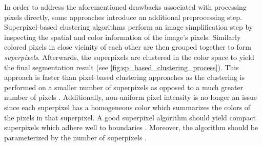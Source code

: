 In order to address the aforementioned drawbacks associated with processing pixels directly, some approaches introduce an additional preprocessing step. Superpixel-based clustering algorithms perform an image simplification step by inspecting the spatial and color information of the image's pixels. Similarly colored pixels in close vicinity of each other are then grouped together to form \emph{superpixels}. Afterwards, the superpixels are clustered in the color space to yield the final segmentation result (see \autoref{fig:sp_based_clustering_process}). This approach is faster than pixel-based clustering approaches as the clustering is performed on a smaller number of superpixels as opposed to a much greater number of pixels \parencite{stutz2018superpixels}. Additionally, non-uniform pixel intensity is no longer an issue since each superpixel has a homogeneous color which summarizes the colors of the pixels in that superpixel. A good superpixel algorithm should yield compact superpixels which adhere well to boundaries \parencite{jia2014fast}. Moreover, the algorithm should be parameterized by the number of superpixels \parencite{stutz2018superpixels}.

